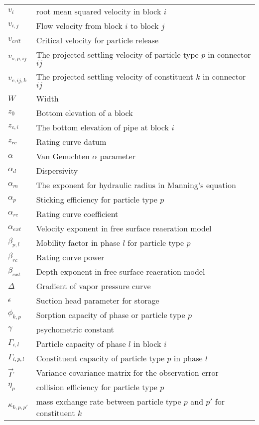 \begin{longtable}{| p{} | p{} |}
$v_i$ & root mean squared velocity in block $i$\\
$v_{i,j}$ & Flow velocity from block $i$ to block $j$ \\
$v_{crit}$ & Critical velocity for particle release \\
$v_{s,p,ij}$ & The projected settling velocity of particle type $p$ in connector $ij$ \\
$v_{c,ij,k}$ & The projected settling velocity of constituent $k$ in connector $ij$ \\
$W$ & Width\\
$z_0$ & Bottom elevation of a block\\
$z_{c,i}$ & The bottom elevation of pipe at block $i$ \\
$z_{rc}$ & Rating curve datum \\
$\alpha$ & Van Genuchten $\alpha$ parameter \\
$\alpha_d$ & Dispersivity \\
$\alpha_m$ & The exponent for hydraulic radius in Manning's equation\\
$\alpha_p$ & Sticking efficiency for particle type $p$ \\
$\alpha_{rc}$ & Rating curve coefficient \\
$\alpha_{ext}$ & Velocity exponent in free surface reaeration model \\
$\beta_{p,l}$ & Mobility factor in phase $l$ for particle type $p$\\
$\beta_{rc}$ & Rating curve power \\
$\beta_{ext}$ & Depth exponent in free surface reaeration model \\
$\Delta$ & Gradient of vapor pressure curve\\
$\epsilon$ & Suction head parameter for storage\\ 
$\phi_{k,p}$ & Sorption capacity of phase or particle type $p$\\
$\gamma$ & psychometric constant \\
$\Gamma_{i,l}$ & Particle capacity of phase $l$ in block $i$ \\
$\Gamma_{i,p,l}$ & Constituent capacity of particle type $p$ in phase $l$ \\
$\vec{\Gamma}$ & Variance-covariance matrix for the observation error \\
$\eta_p$ & collision efficiency for particle type $p$ \\
$\kappa_{k,p,p'}$ & mass exchange rate between particle type $p$ and $p'$ for constituent $k$ \\

\end{longtable}
